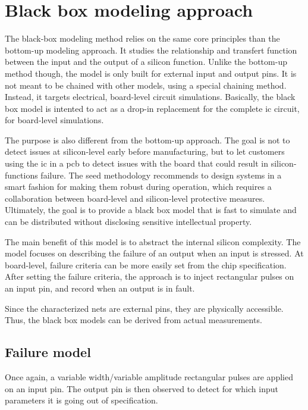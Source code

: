 \section{Black box modeling approach}

The black-box modeling method relies on the same core principles than the bottom-up modeling approach.
It studies the relationship and transfert function between the input and the output of a silicon function.
Unlike the bottom-up method though, the model is only built for external input and output pins.
It is not meant to be chained with other models, using a special chaining method.
Instead, it targets electrical, board-level circuit simulations.
Basically, the black box model is intented to act as a drop-in replacement for the complete \gls{ic} circuit, for board-level simulations.

The purpose is also different from the bottom-up approach.
The goal is not to detect issues at silicon-level early before manufacturing, but to let customers using the \gls{ic} in a \gls{pcb} to detect issues with the board that could result in silicon-functions failure.
The \gls{seed} methodology recommends to design systems in a smart fashion for making them robust during operation, which requires a collaboration between board-level and silicon-level protective measures.
Ultimately, the goal is to provide a black box model that is fast to simulate and can be distributed without disclosing sensitive intellectual property.

The main benefit of this model is to abstract the internal silicon complexity.
The model focuses on describing the failure of an output when an input is stressed.
At board-level, failure criteria can be more easily set from the chip specification.
After setting the failure criteria, the approach is to inject rectangular pulses on an input pin, and record when an output is in fault.

Since the characterized nets are external pins, they are physically accessible.
Thus, the black box models can be derived from actual measurements.

\subsection{Failure model}

Once again, a variable width/variable amplitude rectangular pulses are applied on an input pin.
The output pin is then observed to detect for which input parameters it is going out of specification.

